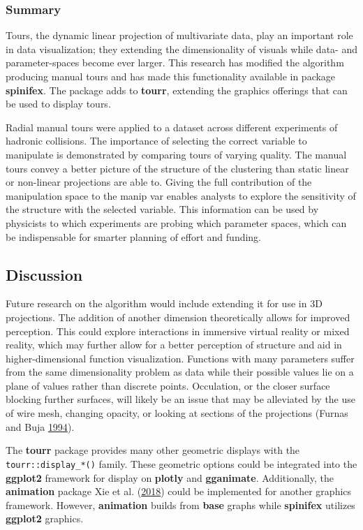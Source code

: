 \hypertarget{summary}{%
\subsubsection{Summary}\label{summary}}

Tours, the dynamic linear projection of multivariate data, play an
important role in data visualization; they extending the dimensionality
of visuals while data- and parameter-spaces become ever larger. This
research has modified the algorithm producing manual tours and has made
this functionality available in package \textbf{spinifex}. The package
adds to \textbf{tourr}, extending the graphics offerings that can be
used to display tours.

Radial manual tours were applied to a dataset across different
experiments of hadronic collisions. The importance of selecting the
correct variable to manipulate is demonstrated by comparing tours of
varying quality. The manual tours convey a better picture of the
structure of the clustering than static linear or non-linear projections
are able to. Giving the full contribution of the manipulation space to
the manip var enables analysts to explore the sensitivity of the
structure with the selected variable. This information can be used by
physicists to which experiments are probing which parameter spaces,
which can be indispensable for smarter planning of effort and funding.

\hypertarget{sec:discussion}{%
\subsection{Discussion}\label{sec:discussion}}

Future research on the algorithm would include extending it for use in
3D projections. The addition of another dimension theoretically allows
for improved perception. This could explore interactions in immersive
virtual reality or mixed reality, which may further allow for a better
perception of structure and aid in higher-dimensional function
visualization. Functions with many parameters suffer from the same
dimensionality problem as data while their possible values lie on a
plane of values rather than discrete points. Occulation, or the closer
surface blocking further surfaces, will likely be an issue that may be
alleviated by the use of wire mesh, changing opacity, or looking at
sections of the projections (Furnas and Buja
\protect\hyperlink{ref-furnas_prosection_1994}{1994}).

The \textbf{tourr} package provides many other geometric displays with
the \texttt{tourr::display\_*()} family. These geometric options could
be integrated into the \textbf{ggplot2} framework for display on
\textbf{plotly} and \textbf{gganimate}. Additionally, the
\textbf{animation} package Xie et al.
(\protect\hyperlink{ref-xie_animation:_2018}{2018}) could be implemented
for another graphics framework. However, \textbf{animation} builds from
\textbf{base} graphs while \textbf{spinifex} utilizes \textbf{ggplot2}
graphics.

